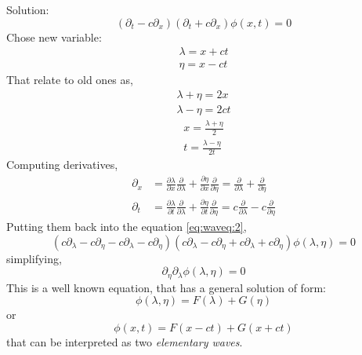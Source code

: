 \documentclass{article}
\begin{document}
Solution: \\
\begin{equation}
	(\partial_t - c\partial_x)(\partial_t + c\partial_x)\phi(x,t) = 0
\end{equation}
Chose new variable: \\
\begin{equation}
	\begin{aligned}
	\lambda = x + ct \\
	\eta = x - ct
	\end{aligned}
\end{equation}
That relate to old ones as,
\begin{equation}
	\begin{aligned}
	\lambda + \eta = 2x \\
	\lambda - \eta = 2ct
	\end{aligned}
\end{equation}
%
\begin{equation}
	\begin{aligned}
	x = \frac{\lambda + \eta}{2} \\
	t = \frac{\lambda - \eta}{2 t}
	\end{aligned}
\end{equation}
Computing derivatives,
\begin{equation}
	\begin{aligned}
	\partial_x &= \frac{\partial\lambda}{\partial x}\frac{\partial}{\partial\lambda} + \frac{\partial\eta}{\partial x}\frac{\partial}{\partial \eta} = \frac{\partial}{\partial\lambda} + \frac{\partial}{\partial\eta} \\
	\partial_t &= \frac{\partial \lambda}{\partial t}\frac{\partial}{\partial \lambda} + \frac{\partial \eta}{\partial t}\frac{\partial}{\partial \eta} = c\frac{\partial}{\partial \lambda} - c\frac{\partial}{\partial \eta} 
	\end{aligned}
\end{equation}
Putting them back into the equation \ref{eq:waveq:2},
\begin{equation}
(c\partial_{\lambda} - c\partial_{\eta} - c\partial_{\lambda} -c\partial_{\eta})(c\partial_{\lambda} -c\partial_{\eta}+c\partial_{\lambda}+c\partial_{\eta})\phi(\lambda,\eta) = 0
\end{equation}
simplifying, 
\begin{equation}
	\partial_{\eta}\partial_{\lambda} \phi(\lambda,\eta) = 0
\end{equation}
This is a well known equation, that has a general solution of form:
\begin{equation}
	\phi(\lambda,\eta) = F(\lambda) + G(\eta)
\end{equation}
or
\begin{equation}
	\label{eq:waveq:gensol}
	\phi(x,t) = F(x-ct) + G(x+ct)
\end{equation}
that can be interpreted as two \textit{elementary waves}.
%
%
%
\end{document}
